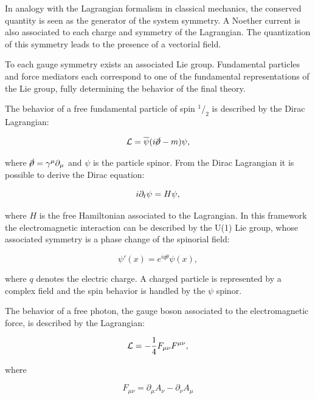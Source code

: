 In analogy with the Lagrangian formalism in classical mechanics, the conserved quantity is seen as the generator of the system symmetry. A Noether current is also associated to each charge and symmetry of the Lagrangian. The quantization of this symmetry leads to the presence of a vectorial field. 

To each gauge symmetry exists an associated Lie group. Fundamental particles and force mediators each correspond to one of the fundamental representations of the Lie group, fully determining the behavior of the final theory.

The behavior of a free fundamental particle of spin $^1/_2$ is described by the Dirac Lagrangian:

\begin{equation}
\mathcal{L}=\overline{\psi}(i\cancel{\partial}-m)\psi,
\label{eq:dirac_lag}
\end{equation}

where $\cancel{\partial} = \gamma^\mu \partial_\mu$ and $\psi$ is the particle spinor. %
From the Dirac Lagrangian it is possible to derive the Dirac equation:

\begin{equation}
i \partial_t\psi = H \psi,
\label{eq:dirac_lag}
\end{equation}

where $H$ is the free Hamiltonian associated to the Lagrangian.
In this framework the electromagnetic interaction can be described by the U(1) Lie group, whose associated symmetry is a phase change of the spinorial field: %

\begin{equation}
\psi'(x) = e^{iq\theta}\psi(x),
\end{equation}

where $q$ denotes the electric charge.
A charged particle is represented by a complex field and the spin behavior is handled by the $\psi$ spinor.

The behavior of a free photon, the gauge boson associated to the electromagnetic force, is described by the Lagrangian:

\begin{equation}
\mathcal{L} = -\frac{1}{4}F_{\mu\nu}F^{\mu\nu},
\end{equation}

where

\begin{equation}
 F_{\mu\nu} =\partial_{\mu}A_{\nu}-\partial_{\nu}A_{\mu}
\end{equation}

